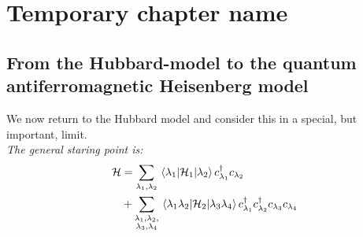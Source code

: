 \chapter{Temporary chapter name}
\section{From the Hubbard-model to the quantum antiferromagnetic Heisenberg model}

We now return to the Hubbard model and consider this in a special, but important, limit.\\

\emph{The general staring point is:}
\begin{align}
\begin{split}
    \mathcal{H} &= \sum_{\lambda_1,\lambda_2} \mel{\lambda_1}{\mathcal{H}_1}{\lambda_2}c_{\lambda_1}^{\dagger} c_{\lambda_2} \\
    &+ \sum_{\substack{\lambda_1, \lambda_2, \\
    \lambda_3, \lambda_4}} \mel{\lambda_1 \lambda_2}{\mathcal{H}_2}{\lambda_3 \lambda_4}c_{\lambda_1}^\dagger c_{\lambda_2}^\dagger c_{\lambda_3} c_{\lambda_4}
\end{split}
\end{align}

